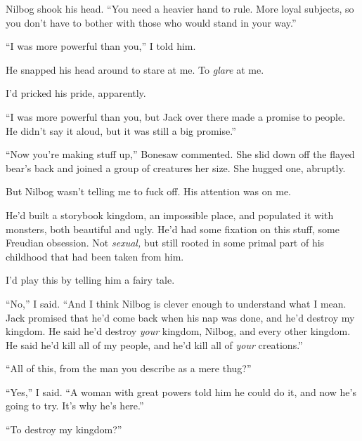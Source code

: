 Nilbog shook his head.  ``You need a heavier hand to rule.  More loyal subjects, so you don't have to bother with those who would stand in your way.''



``I was more powerful than you,'' I told him.



He snapped his head around to stare at me.  To \emph{glare} at me.



I'd pricked his pride, apparently.



``I was more powerful than you, but Jack over there made a promise to people.  He didn't say it aloud, but it was still a big promise.''



``Now you're making stuff up,'' Bonesaw commented.  She slid down off the flayed bear's back and joined a group of creatures her size.  She hugged one, abruptly.



But Nilbog wasn't telling me to fuck off.  His attention was on me.



He'd built a storybook kingdom, an impossible place, and populated it with monsters, both beautiful and ugly.  He'd had some fixation on this stuff, some Freudian obsession.  Not \emph{sexual, }but still rooted in some primal part of his childhood that had been taken from him.



I'd play this by telling him a fairy tale.



``No,'' I said.  ``And I think Nilbog is clever enough to understand what I mean.  Jack promised that he'd come back when his nap was done, and he'd destroy my kingdom.  He said he'd destroy \emph{your }kingdom, Nilbog, and every other kingdom.  He said he'd kill all of my people, and he'd kill all of \emph{your} creations.''



``All of this, from the man you describe as a mere thug?''



``Yes,'' I said.  ``A woman with great powers told him he could do it, and now he's going to try.  It's why he's here.''



``To destroy my kingdom?''



